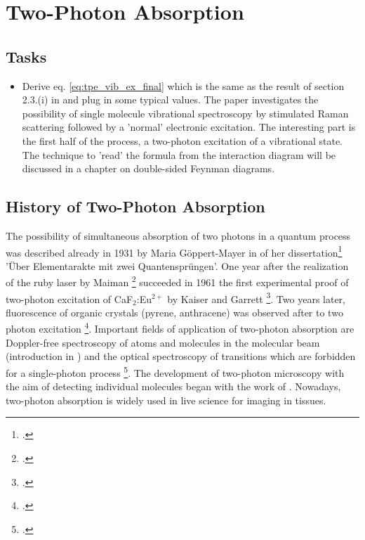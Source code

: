 \renewcommand{\lastmod}{June 15, 2020}
\chapter{Two-Photon Absorption}


\section{Tasks}

\begin{itemize}
\item Derive eq. \ref{eq:tpe_vib_ex_final} which is the same as the result of section 2.3.(i) in \cite{Winterhalder11} and plug in some typical values. The paper investigates the possibility of single molecule vibrational spectroscopy by stimulated Raman scattering followed by a 'normal' electronic excitation. The interesting part is the first half of the process, a two-photon excitation of a vibrational state. The technique to 'read' the formula from the interaction diagram will be discussed in a chapter on double-sided Feynman diagrams.
\end{itemize}



\section{History of Two-Photon Absorption}

The possibility of simultaneous absorption of two photons in
a quantum process was  described already  in 1931  by Maria Göppert-Mayer in
of her dissertation\footcite[About elementary acts with two quantum jumps]{goeppert31}  'Über Elementarakte mit zwei Quantensprüngen'. One year
after the realization of the ruby laser by Maiman
\footcite{maiman60} succeeded in 1961 the first experimental proof of
two-photon excitation of CaF$_2$:Eu$^{2+}$ by Kaiser and
Garrett \footcite{Kaiser61}. Two years later, fluorescence of 
organic crystals (pyrene, anthracene) was observed after to
two photon excitation  \footcite{peticolas63}.  Important
fields of application of two-photon absorption are
Doppler-free spectroscopy of atoms and molecules in the
molecular beam (introduction in 
\cite{Demtroeder_laser}) and the optical
spectroscopy of transitions which are forbidden for a single-photon process \footcite{birge86}. The development of 
two-photon microscopy with the aim of detecting individual
molecules began with the work of  \cite{denk90}. Nowadays, two-photon absorption is widely used in live science for imaging in tissues.





